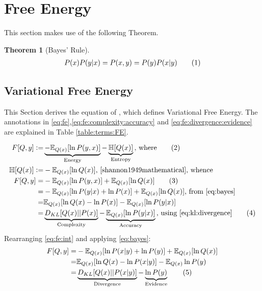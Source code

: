 \documentclass[]{article}
\newcommand{\defeq}{\vcentcolon=}
\newcommand\numberthis{\addtocounter{equation}{1}\tag{\theequation}}
\newtheorem{thm}{Theorem}
\begin{document}
\section{Free Energy}
This section makes use of the following Theorem.

\begin{thm}[Bayes' Rule]
	\begin{align*}
		 P(x)P(y\vert x) = P(x,y) = P(y)P(x\vert y) \numberthis \label{eq:bayes}
	\end{align*}
\end{thm}

\subsection{Variational Free Energy}

This Section derives the equation of \cite[Section 2.5]{parr2022Active}, which defines Variational Free Energy. The annotations in \eqref{eq:fe},\eqref{eq:fe:complexity:accuracy} and \eqref{eq:fe:divergence:evidence} are explained in Table \ref{table:terms:FE}.

\begin{align*}
	F[Q,y] \defeq&\underbrace{ -\mathbb{E}_{Q(x)}[\ln{P(y,x)}] }_\text{Energy}- \underbrace{\mathbb{H}[Q(x)]}_\text{Entropy} \text{, where} \numberthis \label{eq:fe}\\
	\mathbb{H}[Q(x)] \defeq& - \mathbb{E}_{Q(x)} [\ln{Q(x)}] \text{, \cite{shannon1949mathematical}, whence}\\
	F[Q,y] = & -\mathbb{E}_{Q(x)}[\ln{P(y,x)}] + \mathbb{E}_{Q(x)}[\ln{Q(x)}]\numberthis \label{eq:fe:int}\\
	=&-\mathbb{E}_{Q(x)}[\ln{P(y\vert x)} + \ln{P(x)}] + \mathbb{E}_{Q(x)}[\ln{Q(x)}] \text{, from \eqref{eq:bayes}} \\
	=&\mathbb{E}_{Q(x)}[\ln{Q(x)}-\ln{P(x)}] -\mathbb{E}_{Q(x)}[\ln{P(y\vert x)}]\\
	 =&\underbrace{ D_{KL}[Q(x)\lvert\rvert P(x)]}_\text{Complexity} - \underbrace{\mathbb{E}_{Q(x)}[\ln{P(y\vert x)}]}_\text{Accuracy}\text{, using \eqref{eq:kl:divergence}} \numberthis \label{eq:fe:complexity:accuracy}
\end{align*}
Rearranging \eqref{eq:fe:int} and applying  \eqref{eq:bayes}:
\begin{align*}
	F[Q,y] =& -\mathbb{E}_{Q(x)}[\ln{P(x\vert y)} + \ln{P(y)}] + \mathbb{E}_{Q(x)}[\ln{Q(x)}]\\
	=& \mathbb{E}_{Q(x)}[\ln{Q(x)}-\ln{P(x\vert y)]} - \mathbb{E}_{Q(x)}\ln{P(y)}\\
	=&\underbrace{D_{KL}[Q(x)\lvert\rvert P(x\vert y)]}_\text{Divergence} - \underbrace{\ln{P(y)}}_\text{Evidence} \numberthis \label{eq:fe:divergence:evidence}
\end{align*}
\end{document}
